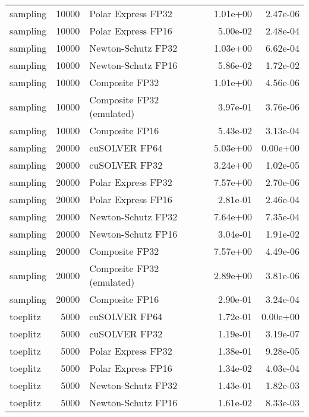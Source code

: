 \begin{table}
\begin{tabular}{lrlrr}
 sampling & 10000 &        Polar Express FP32 &  1.01e+00 &        2.47e-06 \\
 sampling & 10000 &        Polar Express FP16 &  5.00e-02 &        2.48e-04 \\
 sampling & 10000 &        Newton-Schutz FP32 &  1.03e+00 &        6.62e-04 \\
 sampling & 10000 &        Newton-Schutz FP16 &  5.86e-02 &        1.72e-02 \\
 sampling & 10000 &            Composite FP32 &  1.01e+00 &        4.56e-06 \\
 sampling & 10000 & Composite FP32 (emulated) &  3.97e-01 &        3.76e-06 \\
 sampling & 10000 &            Composite FP16 &  5.43e-02 &        3.13e-04 \\
 sampling & 20000 &             cuSOLVER FP64 &  5.03e+00 &        0.00e+00 \\
 sampling & 20000 &             cuSOLVER FP32 &  3.24e+00 &        1.02e-05 \\
 sampling & 20000 &        Polar Express FP32 &  7.57e+00 &        2.70e-06 \\
 sampling & 20000 &        Polar Express FP16 &  2.81e-01 &        2.46e-04 \\
 sampling & 20000 &        Newton-Schutz FP32 &  7.64e+00 &        7.35e-04 \\
 sampling & 20000 &        Newton-Schutz FP16 &  3.04e-01 &        1.91e-02 \\
 sampling & 20000 &            Composite FP32 &  7.57e+00 &        4.49e-06 \\
 sampling & 20000 & Composite FP32 (emulated) &  2.89e+00 &        3.81e-06 \\
 sampling & 20000 &            Composite FP16 &  2.90e-01 &        3.24e-04 \\
 toeplitz &  5000 &             cuSOLVER FP64 &  1.72e-01 &        0.00e+00 \\
 toeplitz &  5000 &             cuSOLVER FP32 &  1.19e-01 &        3.19e-07 \\
 toeplitz &  5000 &        Polar Express FP32 &  1.38e-01 &        9.28e-05 \\
 toeplitz &  5000 &        Polar Express FP16 &  1.34e-02 &        4.03e-04 \\
 toeplitz &  5000 &        Newton-Schutz FP32 &  1.43e-01 &        1.82e-03 \\
 toeplitz &  5000 &        Newton-Schutz FP16 &  1.61e-02 &        8.33e-03 \\

\end{tabular}
\end{table}
